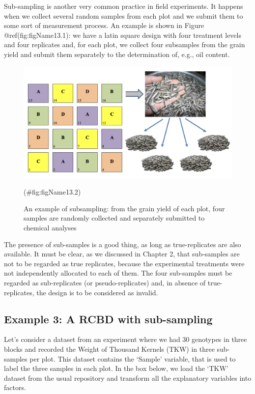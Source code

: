 \documentclass[a4paper,12pt,oneside]{book}
\begin{document}
Sub-sampling is another very common practice in field experiments. It happens when we collect several random samples from each plot and we submit them to some sort of measurement process. An example is shown in Figure @ref(fig:figName13.1): we have a latin square design with four treatment levels and four replicates and, for each plot, we collect four subsamples from the grain yield and submit them separately to the determination of, e.g., oil content.

\begin{figure}

{\centering \includegraphics[width=0.9\linewidth]{_images/subsampling2} 

}

\caption{An example of subsampling: from the grain yield of each plot, four samples are randomly collected and separately submitted to chemical analyses}(\#fig:figName13.2)
\end{figure}

The presence of sub-samples is a good thing, as long as true-replicates are also available. It must be clear, as we discussed in Chapter 2, that sub-samples are not to be regarded as true replicates, because the experimental treatments were not independently allocated to each of them. The four sub-samples must be regarded as sub-replicates (or pseudo-replicates) and, in absence of true-replicates, the design is to be considered as invalid.

\hypertarget{example-3-a-rcbd-with-sub-sampling}{%
\subsection{Example 3: A RCBD with sub-sampling}\label{example-3-a-rcbd-with-sub-sampling}}

Let's consider a dataset from an experiment where we had 30 genotypes in three blocks and recorded the Weight of Thousand Kernels (TKW) in three sub-samples per plot. This dataset contains the `Sample' variable, that is used to label the three samples in each plot. In the box below, we load the `TKW' dataset from the usual repository and transform all the explanatory variables into factors.
\end{document}
